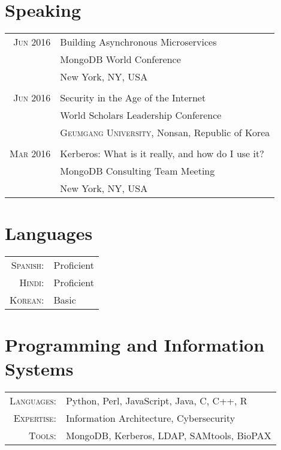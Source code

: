\documentclass[a4paper,10pt]{article}
\begin{document}
\section{Speaking}
\begin{tabular}{rp{11cm}}
 \textsc{Jun} 2016 & Building Asynchronous Microservices \\
 								 & MongoDB World Conference\\
 								 & New York, NY, USA  \\
 \multicolumn{2}{c}{} \\
 \textsc{Jun} 2016 & Security in the Age of the Internet\\
 							    &  World Scholars Leadership Conference\\
 							    &  \textsc{Geumgang University}, Nonsan, Republic of Korea \\
 \multicolumn{2}{c}{} \\
 \textsc{Mar} 2016 & Kerberos: What is it really, and how do I use it?\\
 							    &  MongoDB Consulting Team Meeting\\
 							    &  New York, NY, USA \\
\end{tabular}

\section{Languages}
\begin{tabular}{rl}
\textsc{Spanish:}&Proficient\\
\textsc{Hindi:}&Proficient\\
\textsc{Korean:}&Basic\\
\end{tabular}

\section{Programming and Information Systems}
\begin{tabular}{rl}
\textsc{Languages:}&Python, Perl, JavaScript, Java, C, C++, R\\
\textsc{Expertise:}&Information Architecture, Cybersecurity\\
\textsc{Tools:}&MongoDB, Kerberos, LDAP, SAMtools, BioPAX
\end{tabular}
\end{document}
